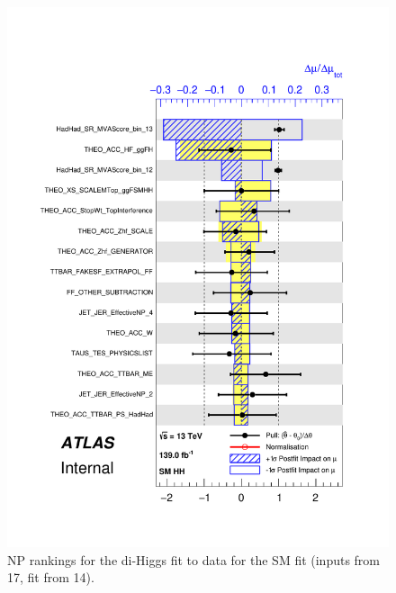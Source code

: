 \begin{figure}
\centering
\includegraphics[width=.8\textwidth]{figures/results/HH/HadHad/HadHadFit14072021/PullsAndRankings/pulls_SigXsecOverSM_0.pdf}
\caption{NP rankings for the di-Higgs \hadhad fit to data for the SM fit (inputs from 17, fit from 14).}
\label{fig:HadHadPostfitNPRankingsSM}
\end{figure}

